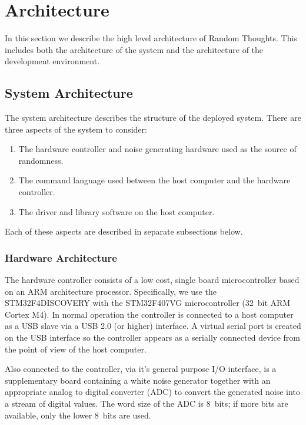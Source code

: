 
\chapter{Architecture}
\label{chapt:architecture}

In this section we describe the high level architecture of Random Thoughts. This includes both
the architecture of the system and the architecture of the development environment.

\section{System Architecture}

The system architecture describes the structure of the deployed system. There are three aspects
of the system to consider:

\begin{enumerate}
\item The hardware controller and noise generating hardware used as the source of randomness.
\item The command language used between the host computer and the hardware controller.
\item The driver and library software on the host computer.
\end{enumerate}

Each of these aspects are described in separate subsections below.

\subsection{Hardware Architecture}

The hardware controller consists of a low cost, single board microcontroller based on an ARM
architecture processor. Specifically, we use the STM32F4DISCOVERY with the STM32F407VG
microcontroller (32~bit ARM Cortex M4). In normal operation the controller is connected to a
host computer as a USB slave via a USB 2.0 (or higher) interface. A virtual serial port is
created on the USB interface so the controller appears as a serially connected device from the
point of view of the host computer.

Also connected to the controller, via it's general purpose I/O interface, is a supplementary
board containing a white noise generator together with an appropriate analog to digital
converter (ADC) to convert the generated noise into a stream of digital values. The word size of
the ADC is 8~bits; if more bits are available, only the lower 8~bits are used.

